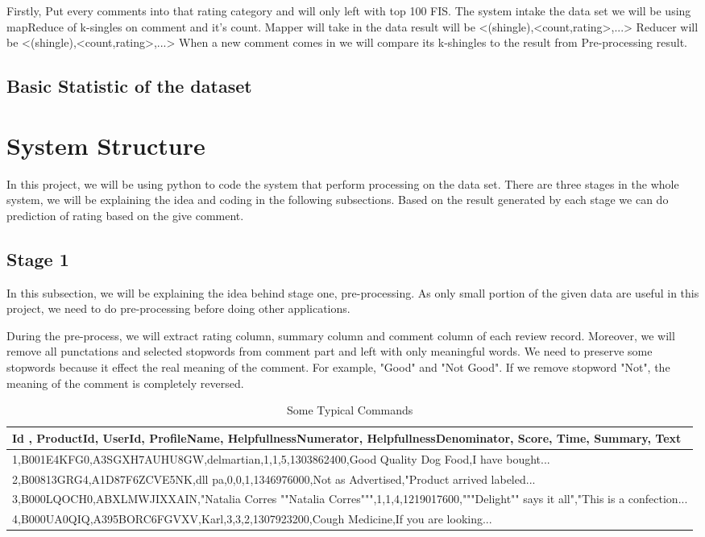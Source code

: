 Firstly, Put every comments into that rating category and will only left with top 100 FIS. 
The system intake the data set we will be using mapReduce of k-singles on comment and it's count.
Mapper will take in the data result will be <(shingle),<count,rating>,...>
Reducer will be <(shingle),<count,rating>,...>
When a new comment comes in we will compare its k-shingles to the result from Pre-processing result.

\subsection{Basic Statistic of the dataset}

\section{System Structure}
In this project, we will be using python to code the system that perform processing on the data set. There are three stages in the whole system, we will be explaining the idea and coding in the following subsections. Based on the result generated by each stage we can do prediction of rating based on the give comment.
\subsection{Stage 1}
In this subsection, we will be explaining the idea behind stage one, pre-processing. As only small portion of the given data are useful in this project, we need to do pre-processing before doing other applications.

During the pre-process, we will extract rating column, summary column and comment column of each review record. Moreover, we will remove all punctations and selected stopwords from comment part and left with only meaningful words. We need to preserve some stopwords because it effect the real meaning of the comment. For example, "Good" and "Not Good". If we remove stopword "Not", the meaning of the comment is completely reversed.

\begin{table*}
  \caption{Some Typical Commands}
  \label{tab:commands}
  \begin{tabular}{l}
    \toprule
    Id , ProductId, UserId, ProfileName, HelpfullnessNumerator, HelpfullnessDenominator, Score, Time, Summary, Text\\
    \midrule
    1,B001E4KFG0,A3SGXH7AUHU8GW,delmartian,1,1,5,1303862400,Good Quality Dog Food,I have bought... \\
    2,B00813GRG4,A1D87F6ZCVE5NK,dll pa,0,0,1,1346976000,Not as Advertised,"Product arrived labeled...\\
    3,B000LQOCH0,ABXLMWJIXXAIN,"Natalia Corres ""Natalia Corres""",1,1,4,1219017600,"""Delight"" says it all","This is a confection...\\
    4,B000UA0QIQ,A395BORC6FGVXV,Karl,3,3,2,1307923200,Cough Medicine,If you are looking... \\
    \bottomrule
  \end{tabular}
\end{table*}

